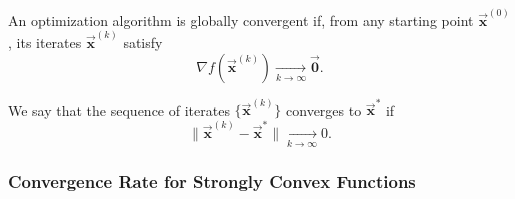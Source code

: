 \documentclass[9pt, headings=standardclasses, parskip=half]{scrartcl}
\renewcommand{\emph}[1]{\textcolor{mypurple}{#1}}
\newcommand{\vect}[1]{\vec{\boldsymbol{#1}}}
\begin{document}
\begin{definition}
An optimization algorithm is globally convergent if, from any starting point \(\vect{x}^{(0)}\), its iterates \(\vect{x}^{(k)}\) satisfy
\[
\nabla f\left(\vect{x}^{(k)}\right) \xrightarrow[k \rightarrow \infty]{} \vect{0}.
\]
\end{definition}

\begin{definition}
We say that the sequence of iterates \(\{\vect{x}^{(k)}\}\) converges to \(\vect{x}^{*}\) if
\[
\|\vect{x}^{(k)}-\vect{x}^{*}\| \xrightarrow[k \rightarrow \infty]{} 0.
\]
\end{definition}

\subsubsection{Convergence Rate for Strongly Convex Functions}
\label{subsec:gd_strongly_convex}
\end{document}
